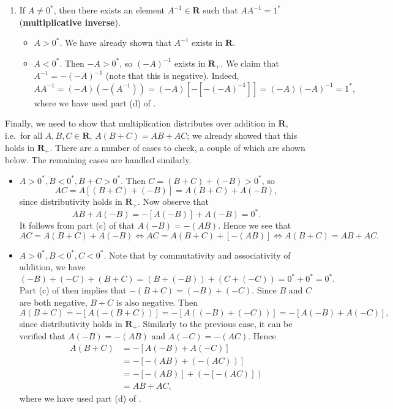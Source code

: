 \documentclass[12pt]{article}
\newcommand{\R}{\mathbf{R}}
\theoremstyle{definition}
\begin{document}
\begin{enumerate}[label = (M\arabic*)]
    \item If \( A \neq 0^* \), then there exists an element \( A^{-1} \in \R \) such that \( A A^{-1} = 1^* \) (\textbf{multiplicative inverse}).

    \begin{itemize}
        \item \( A > 0^* \). We have already shown that \( A^{-1} \) exists in \( \R \).

        \item \( A < 0^* \). Then \( -A > 0^* \), so \( (-A)^{-1} \) exists in \( \R_+ \). We claim that \( A^{-1} = -(-A)^{-1} \) (note that this is negative). Indeed,
        \[
            A A^{-1} = (-A)(-\left(A^{-1}\right)) = (-A)[-[-(-A)^{-1}]] = (-A)(-A)^{-1} = 1^*,
        \]
        where we have used part (d) of .
    \end{itemize}
\end{enumerate}

Finally, we need to show that multiplication distributes over addition in \( \R \), i.e.\ for all \( A, B, C \in \R \), \( A(B + C) = AB + AC \); we already showed that this holds in \( \R_+ \). There are a number of cases to check, a couple of which are shown below. The remaining cases are handled similarly.

\begin{itemize}
    \item \( A > 0^*, B < 0^*, B + C > 0^* \). Then \( C = (B + C) + (-B) > 0^* \), so
    \[
        AC = A[(B + C) + (-B)] = A(B + C) + A(-B),
    \]
    since distributivity holds in \( \R_+ \). Now observe that
    \[
        AB + A(-B) = -[A(-B)] + A(-B) = 0^*.
    \]
    It follows from part (c) of  that \( A(-B) = -(AB) \). Hence we see that
    \[
        AC = A(B + C) + A(-B) \iff AC = A(B + C) + [-(AB)] \iff A(B + C) = AB + AC.
    \]

    \item \( A > 0^*, B < 0^*, C < 0^* \). Note that by commutativity and associativity of addition, we have
    \[
        (-B) + (-C) + (B + C) = (B + (-B)) + (C + (-C)) = 0^* + 0^* = 0^*.
    \]
    Part (c) of  then implies that \( -(B + C) = (-B) + (-C) \). Since \( B \) and \( C \) are both negative, \( B + C \) is also negative. Then
    \[
        A(B + C) = -[A(-(B + C))] = -[A((-B) + (-C))] = -[A(-B) + A(-C)],
    \]
    since distributivity holds in \( \R_+ \). Similarly to the previous case, it can be verified that \( A(-B) = -(AB) \) and \( A(-C) = -(AC) \). Hence
    \begin{align*}
        A(B + C) &= -[A(-B) + A(-C)] \\
        &= -[-(AB) + (-(AC))] \\
        &= -[-(AB)] + (-[-(AC)]) \\
        &= AB + AC,
    \end{align*}
    where we have used part (d) of .
\end{itemize}
\end{document}
